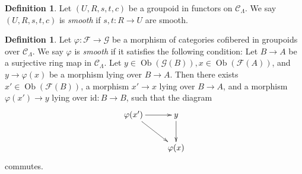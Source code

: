 \documentclass{amsart}
\theoremstyle{plain}
\theoremstyle{definition}
\newtheorem{definition}[subsection]{Definition}
\theoremstyle{remark}
\numberwithin{equation}{subsection}
\def\Ob{\mathop{\mathrm{Ob}}\nolimits}
\begin{document}
\begin{definition}
\label{definition-smooth-groupoid-in-functors}
Let $(U, R, s, t, c)$ be a groupoid in functors on $\mathcal{C}_\Lambda$. We
say $(U, R, s, t, c)$ is {\it smooth} if $s, t: R \to U$ are smooth.
\end{definition}

\begin{definition}
\label{definition-smooth-morphism}
Let $\varphi : \mathcal{F} \to \mathcal{G}$ be a morphism of categories
cofibered in groupoids over $\mathcal{C}_\Lambda$.  We say  $\varphi$ is
{\it smooth} if it satisfies the following condition: Let $B \to A$ be
a surjective ring map in $\mathcal{C}_\Lambda$.  Let $y \in
\Ob(\mathcal{G}(B)), x \in \Ob(\mathcal{F}(A))$, and $y
\to \varphi(x)$ be a morphism lying over $B \to A$.  Then there
exists $x' \in \Ob(\mathcal{F}(B))$, a morphism $x' \to x$
lying over $B \to A$, and a morphism $\varphi(x') \to y$ lying
over $\text{id}: B \to B$, such that the diagram
$$
\xymatrix{
\varphi(x') \ar[r] \ar[dr] & y \ar[d] \\
& \varphi(x)
}
$$
commutes.
\end{definition}
\end{document}
